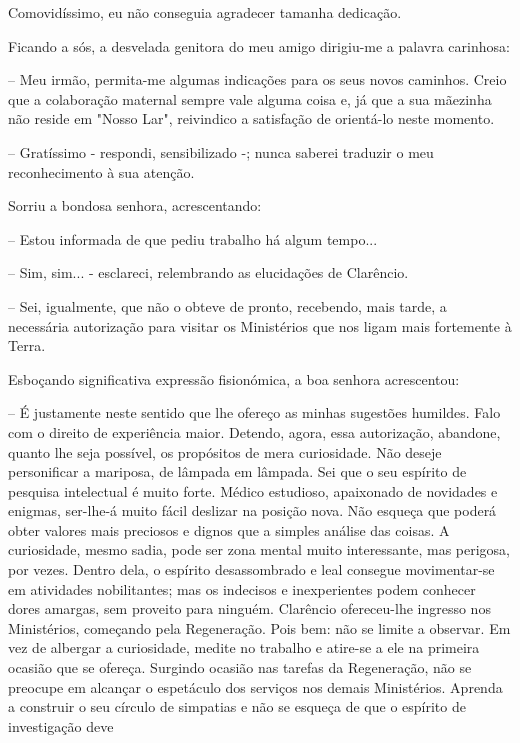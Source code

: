 \documentclass[portuguese,12pt,a4paper]{scrbook}
\begin{document}
	Comovidíssimo, eu não conseguia agradecer tamanha dedicação.
	
	Ficando a sós, a desvelada genitora do meu amigo dirigiu-me a palavra carinhosa:
	
	– Meu irmão, permita-me algumas indicações para os seus novos caminhos. Creio que a colaboração maternal sempre vale alguma coisa e, já que a sua mãezinha não reside em "Nosso Lar", reivindico a satisfação de orientá-lo neste momento.
	
	
	– Gratíssimo - respondi, sensibilizado -; nunca saberei traduzir o meu reconhecimento à sua atenção.
	
	Sorriu a bondosa senhora, acrescentando:
	
	– Estou informada de que pediu trabalho há algum tempo...
	
	– Sim, sim... - esclareci, relembrando as elucidações de Clarêncio.
	
	– Sei, igualmente, que não o obteve de pronto, recebendo, mais tarde, a necessária autorização para visitar os Ministérios que nos ligam mais fortemente à Terra.
	
	Esboçando significativa expressão fisionómica, a boa senhora acrescentou:
	
	– É justamente neste sentido que lhe ofereço as minhas sugestões humildes. Falo com o direito de experiência maior. Detendo, agora, essa autorização, abandone, quanto lhe seja possível, os propósitos de mera curiosidade. Não deseje personificar a mariposa, de lâmpada em lâmpada. Sei que o seu espírito de pesquisa intelectual é muito forte. Médico estudioso, apaixonado de novidades e enigmas, ser-lhe-á muito fácil deslizar na posição nova. Não esqueça que poderá obter valores mais preciosos e dignos que a simples análise das coisas. A curiosidade, mesmo sadia, pode ser zona mental muito interessante, mas perigosa, por vezes. Dentro dela, o espírito desassombrado e leal consegue movimentar-se em atividades nobilitantes; mas os indecisos e inexperientes podem conhecer dores amargas, sem proveito para ninguém. Clarêncio ofereceu-lhe ingresso nos Ministérios, começando pela Regeneração. Pois bem: não se limite a observar. Em vez de albergar a curiosidade, medite no trabalho e atire-se a ele na primeira ocasião que se ofereça. Surgindo ocasião nas tarefas da Regeneração, não se preocupe em alcançar o espetáculo dos serviços nos demais Ministérios. Aprenda a construir o seu círculo de simpatias e não se esqueça de que o espírito de investigação deve
	
\end{document}
